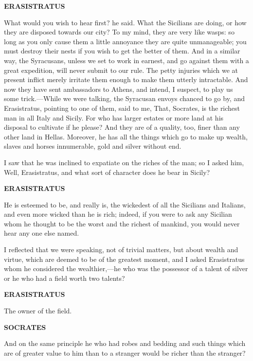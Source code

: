 \documentclass[11pt,letter]{article}
\begin{document}
\par \textbf{ERASISTRATUS}
\par   What would you wish to hear first? he said. What the Sicilians are doing, or how they are disposed towards our city? To my mind, they are very like wasps:  so long as you only cause them a little annoyance they are quite unmanageable; you must destroy their nests if you wish to get the better of them. And in a similar way, the Syracusans, unless we set to work in earnest, and go against them with a great expedition, will never submit to our rule. The petty injuries which we at present inflict merely irritate them enough to make them utterly intractable. And now they have sent ambassadors to Athens, and intend, I suspect, to play us some trick.—While we were talking, the Syracusan envoys chanced to go by, and Erasistratus, pointing to one of them, said to me, That, Socrates, is the richest man in all Italy and Sicily. For who has larger estates or more land at his disposal to cultivate if he please? And they are of a quality, too, finer than any other land in Hellas. Moreover, he has all the things which go to make up wealth, slaves and horses innumerable, gold and silver without end.

\par  I saw that he was inclined to expatiate on the riches of the man; so I asked him, Well, Erasistratus, and what sort of character does he bear in Sicily?

\par \textbf{ERASISTRATUS}
\par   He is esteemed to be, and really is, the wickedest of all the Sicilians and Italians, and even more wicked than he is rich; indeed, if you were to ask any Sicilian whom he thought to be the worst and the richest of mankind, you would never hear any one else named.

\par  I reflected that we were speaking, not of trivial matters, but about wealth and virtue, which are deemed to be of the greatest moment, and I asked Erasistratus whom he considered the wealthier,—he who was the possessor of a talent of silver or he who had a field worth two talents?

\par \textbf{ERASISTRATUS}
\par   The owner of the field.

\par \textbf{SOCRATES}
\par   And on the same principle he who had robes and bedding and such things which are of greater value to him than to a stranger would be richer than the stranger?
\end{document}
